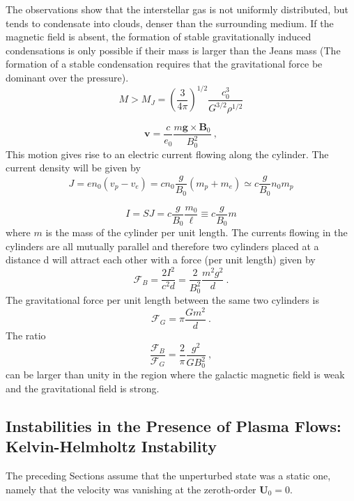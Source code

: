 \documentclass[12pt,a4paper]{article}
\renewcommand{\vec}[1]{\boldsymbol{#1}}
\begin{document}
The observations show that the interstellar gas is not uniformly distributed, but tends to condensate into clouds, denser than the surrounding medium. If the magnetic field is absent, the formation of stable gravitationally induced condensations is only possible if their mass is larger than the Jeans mass (The formation of a stable condensation requires that the gravitational force be dominant over the pressure).
\begin{equation}
M > M_J = \left(\frac{3}{4\pi} \right)^{1/2} \frac{c_0^3}{G^{3/2} \rho^{1/2} }
\end{equation}

\begin{equation*}
\vec{v} = \frac{c}{e_0} \frac{m\vec{g} \times \vec{B}_0}{B_0^2} ~,
\end{equation*}
This motion gives rise to an electric current flowing along the cylinder. The current density will be given by
\begin{equation*}
J = en_0 (v_p -v_e) = cn_0 \frac{g}{B_0} (m_p +m_e) \simeq c\frac{g}{B_0} n_0 m_p
\end{equation*}

\begin{equation*}
I = S J = c\frac{g}{B_0} \frac{m_0}{\ell} \equiv c\frac{g}{B_0} m
\end{equation*}
where $m$ is the mass of the cylinder per unit length. The currents flowing in the cylinders are all mutually parallel and therefore two cylinders placed at a distance d will attract each other with a force (per unit length) given by
\begin{equation*}
\mathcal F_B = \frac{2I^2}{c^2 d} = \frac{2}{B^2_0} \frac{m^2 g^2}{d} ~.
\end{equation*}
The gravitational force per unit length between the same two cylinders is
\begin{equation*}
\mathcal F_G = \pi \frac{G m^2}{d} ~.
\end{equation*}
The ratio 
\begin{equation}
\frac{\mathcal F_B}{\mathcal F_G} = \frac{2}{\pi} \frac{g^2}{G B_0^2} ~,
\end{equation}
can be larger than unity in the region where the galactic magnetic field is weak and the gravitational field is strong.



\subsection{Instabilities in the Presence of Plasma Flows: Kelvin-Helmholtz Instability}
The preceding Sections assume that the unperturbed state was a static one, namely that the velocity was vanishing at the zeroth-order $\vec{U}_0 = 0$.
\end{document}
